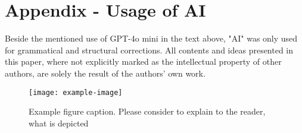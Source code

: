 \documentclass[12pt,a4paper,twocolumn]{article}
\begin{document}
\section{Appendix - Usage of AI}
Beside the mentioned use of GPT-4o mini in the text above, "AI" was only used for grammatical and structural corrections. All contents and ideas presented in this paper, where not explicitly marked as the intellectual property of other authors, are solely the result of the authors’ own work.


\begin{figure}
    \centering
        \texttt{[image: example-image]}
    \caption{Example figure caption. Please consider to explain to the reader, what is depicted}
    \label{fig:example}
\end{figure}
\end{document}

